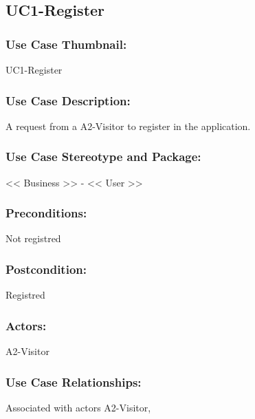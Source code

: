 \documentclass[11pt, openany]{report}
\begin{document}

\subsection{UC1-Register}
\label{UC1}
\subsubsection{Use Case Thumbnail:}
UC1-Register
\subsubsection{Use Case Description:}
A request from a A2-Visitor to register in the application.
\subsubsection{Use Case Stereotype and Package:}
<< Business >> - << User >>
\subsubsection{Preconditions:}
Not registred
\subsubsection{Postcondition:}
Registred
\subsubsection{Actors:}
A2-Visitor
\subsubsection{Use Case Relationships:}
Associated with actors A2-Visitor,
\end{document}
